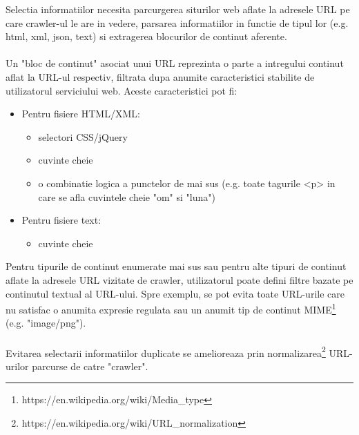 Selectia informatiilor necesita parcurgerea siturilor web aflate la adresele URL pe care crawler-ul le are in vedere, parsarea informatiilor in functie de tipul lor (e.g. html, xml, json, text) si extragerea blocurilor de continut aferente.
\\
\\
Un "bloc de continut" asociat unui URL reprezinta o parte a intregului continut aflat la URL-ul respectiv, filtrata dupa anumite caracteristici stabilite de utilizatorul serviciului web. Aceste caracteristici pot fi:

\begin{itemize}
	\item{Pentru fisiere HTML/XML:
		\begin{itemize}
			\item{selectori CSS/jQuery}
			\item{cuvinte cheie}
			\item{o combinatie logica a punctelor de mai sus (e.g. toate tagurile \textless{}p\textgreater{ }  in care se afla cuvintele cheie "om" si "luna")}
		\end{itemize}			
	}
	\item{Pentru fisiere text:
		\begin{itemize}
			\item{cuvinte cheie}
		\end{itemize}			
	}
\end{itemize}

\noindent
Pentru tipurile de continut enumerate mai sus sau pentru alte tipuri de continut aflate la adresele URL vizitate de crawler, utilizatorul poate defini filtre bazate pe continutul textual al URL-ului. Spre exemplu, se pot evita toate URL-urile care nu satisfac o anumita expresie regulata sau un anumit tip de continut  MIME\footnote{https://en.wikipedia.org/wiki/Media\_type} (e.g. "image/png"). 
\\
\\
Evitarea selectarii informatiilor duplicate se amelioreaza prin normalizarea\footnote{https://en.wikipedia.org/wiki/URL\_normalization} URL-urilor parcurse de catre "crawler".
